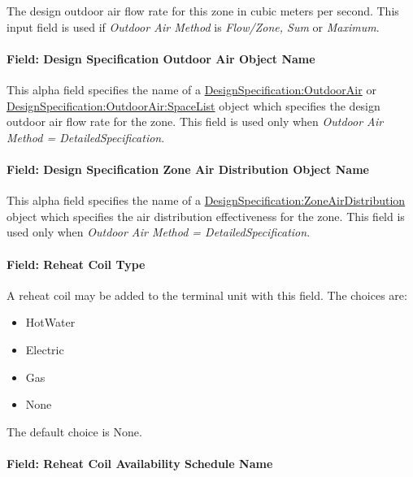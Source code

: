 The design outdoor air flow rate for this zone in cubic meters per second. This input field is used if \emph{Outdoor Air Method} is \emph{Flow/Zone, Sum} or \emph{Maximum}.

\paragraph{Field: Design Specification Outdoor Air Object Name}\label{field-design-specification-outdoor-air-object-name-9}

This alpha field specifies the name of a \hyperref[designspecificationoutdoorair]{DesignSpecification:OutdoorAir} or \hyperref[designspecificationoutdoorairspacelist]{DesignSpecification:OutdoorAir:SpaceList} object which specifies the design outdoor air flow rate for the zone. This field is used only when \emph{Outdoor Air Method = DetailedSpecification}.

\paragraph{Field: Design Specification Zone Air Distribution Object Name}\label{field-design-specification-zone-air-distribution-object-name-10}

This alpha field specifies the name of a \hyperref[designspecificationzoneairdistribution]{DesignSpecification:ZoneAirDistribution} object which specifies the air distribution effectiveness for the zone. This field is used only when \emph{Outdoor Air Method = DetailedSpecification}.

\paragraph{Field: Reheat Coil Type}\label{field-reheat-coil-type-3}

A reheat coil may be added to the terminal unit with this field. The choices are:

\begin{itemize}
\item
  HotWater
\item
  Electric
\item
  Gas
\item
  None
\end{itemize}

The default choice is None.

\paragraph{Field: Reheat Coil Availability Schedule Name}\label{field-reheat-coil-availability-schedule-name-3}

